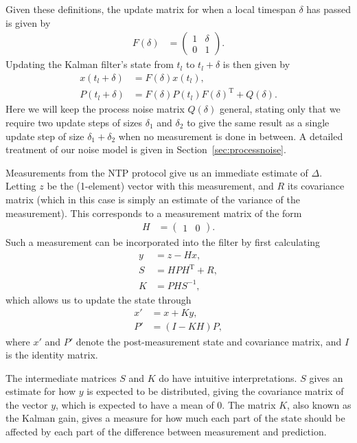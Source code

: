 \documentclass{article}
\begin{document}
Given these definitions, the update matrix for when a local timespan $\delta$ has passed is given by
\begin{align}
F(\delta) &= \begin{pmatrix}
1 & \delta\\
0 & 1
\end{pmatrix}.
\end{align}
Updating the Kalman filter's state from $t_l$ to $t_l+\delta$ is then given by
\begin{align}
x(t_l+\delta) &= F(\delta)x(t_l),\\
P(t_l+\delta) &= F(\delta)P(t_l)F(\delta)^\mathrm{T} + Q(\delta).
\end{align}
Here we will keep the process noise matrix $Q(\delta)$ general, stating only that we require two update steps of sizes $\delta_1$ and $\delta_2$
to give the same result as a single update step of size $\delta_1 + \delta_2$ when no measurement is done in between.
A detailed treatment of our noise model is given in Section~\ref{sec:processnoise}.

Measurements from the NTP protocol give us an immediate estimate of $\Delta$. Letting $z$ be the (1-element) vector with this measurement,
and $R$ its covariance matrix (which in this case is simply an estimate of the variance of the measurement).
This corresponds to a measurement matrix of the form
\begin{align}
H &= \begin{pmatrix}
1 & 0
\end{pmatrix}.
\end{align}
Such a measurement can be incorporated into the filter by first calculating
\begin{align}
y &= z - Hx,\\
S &= H P H^\mathrm{T} + R,\\
K &= P H S^{-1},
\end{align}
which allows us to update the state through
\begin{align}
x' &= x + Ky,\\
P' &= (I - K H)P,
\end{align}
where $x'$ and $P'$ denote the post-measurement state and covariance matrix, and $I$ is the identity matrix.

The intermediate matrices $S$ and $K$ do have intuitive interpretations. $S$ gives an estimate for how $y$ is expected to be distributed, giving the covariance matrix of the vector $y$, which is expected to have a mean of $0$. The matrix $K$, also known as the Kalman gain, gives a measure for how much each part of the state should be affected by each part of the difference between measurement and prediction.
\end{document}

